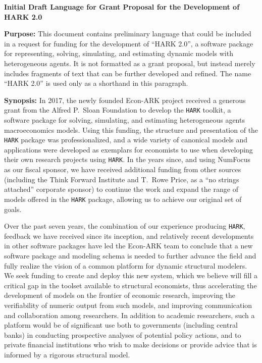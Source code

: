 \documentclass[12pt,pdftex,letterpaper]{article}
\begin{document}
\begin{center}
	\singlespacing \textbf{Initial Draft Language for Grant Proposal for the Development of HARK 2.0}
\end{center}

\noindent \textbf{Purpose:} This document contains preliminary language that could be included in a request for funding for the development of ``HARK 2.0'', a software package for representing, solving, simulating, and estimating dynamic models with heterogeneous agents. It is not formatted as a grant proposal, but instead merely includes fragments of text that can be further developed and refined.  The name ``HARK 2.0'' is used only as a shorthand in this paragraph. 

\vspace{0.5cm}

\noindent \textbf{Synopsis:} In 2017, the newly founded Econ-ARK project received a generous grant from the Alfred P.\ Sloan Foundation to develop the \texttt{HARK} toolkit, a software package for solving, simulating, and estimating heterogeneous agents macroeconomics models. Using this funding, the structure and presentation of the \texttt{HARK} package was professionalized, and a wide variety of canonical models and applications were developed as exemplars for economists to use when developing their own research projects using \texttt{HARK}. In the years since, and using NumFocus as our fiscal sponsor, we have received additional funding from other sources (including the Think Forward Institute and T.\ Rowe Price, as a ``no strings attached'' corporate sponsor) to continue the work and expand the range of models offered in the \texttt{HARK} package, allowing us to achieve our original set of goals.

Over the past seven years, the combination of our experience producing \texttt{HARK}, feedback we have received since its inception, and relatively recent developments in other software packages have led the Econ-ARK team to conclude that a new software package and modeling schema is needed to further advance the field and fully realize the vision of a common platform for dynamic structural modelers. We seek funding to create and deploy this new system, which we believe will fill a critical gap in the toolset available to structural economists, thus accelerating the development of models on the frontier of economic research, improving the verifiability of numeric output from such models, and improving communication and collaboration among researchers. In addition to academic researchers, such a platform would be of significant use both to governments (including central banks) in conducting prospective analyses of potential policy actions, and to private financial institutions who wish to make decisions or provide advice that is informed by a rigorous structural model.
\end{document}
